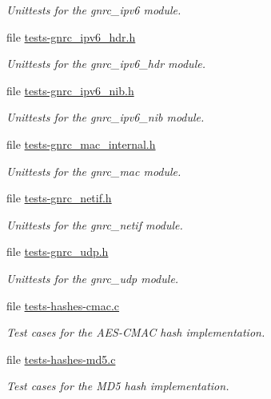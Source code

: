 \begin{DoxyCompactItemize}
\begin{DoxyCompactList}\small\item\em Unittests for the {\ttfamily gnrc\+\_\+ipv6} module. \end{DoxyCompactList}\item 
file \hyperlink{tests-gnrc__ipv6__hdr_8h}{tests-\/gnrc\+\_\+ipv6\+\_\+hdr.\+h}
\begin{DoxyCompactList}\small\item\em Unittests for the {\ttfamily gnrc\+\_\+ipv6\+\_\+hdr} module. \end{DoxyCompactList}\item 
file \hyperlink{tests-gnrc__ipv6__nib_8h}{tests-\/gnrc\+\_\+ipv6\+\_\+nib.\+h}
\begin{DoxyCompactList}\small\item\em Unittests for the {\ttfamily gnrc\+\_\+ipv6\+\_\+nib} module. \end{DoxyCompactList}\item 
file \hyperlink{tests-gnrc__mac__internal_8h}{tests-\/gnrc\+\_\+mac\+\_\+internal.\+h}
\begin{DoxyCompactList}\small\item\em Unittests for the {\ttfamily gnrc\+\_\+mac} module. \end{DoxyCompactList}\item 
file \hyperlink{tests-gnrc__netif_8h}{tests-\/gnrc\+\_\+netif.\+h}
\begin{DoxyCompactList}\small\item\em Unittests for the {\ttfamily gnrc\+\_\+netif} module. \end{DoxyCompactList}\item 
file \hyperlink{tests-gnrc__udp_8h}{tests-\/gnrc\+\_\+udp.\+h}
\begin{DoxyCompactList}\small\item\em Unittests for the {\ttfamily gnrc\+\_\+udp} module. \end{DoxyCompactList}\item 
file \hyperlink{tests-hashes-cmac_8c}{tests-\/hashes-\/cmac.\+c}
\begin{DoxyCompactList}\small\item\em Test cases for the A\+E\+S-\/\+C\+M\+AC hash implementation. \end{DoxyCompactList}\item 
file \hyperlink{tests-hashes-md5_8c}{tests-\/hashes-\/md5.\+c}
\begin{DoxyCompactList}\small\item\em Test cases for the M\+D5 hash implementation. \end{DoxyCompactList}\item 

\end{DoxyCompactItemize}

